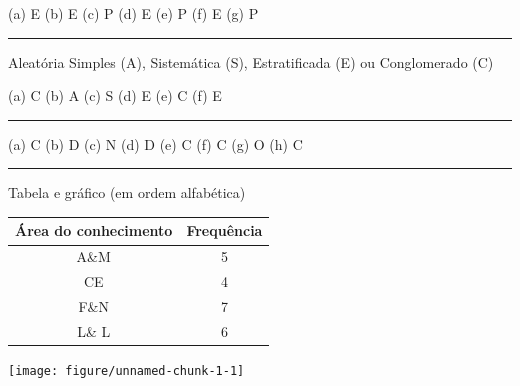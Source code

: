\documentclass[a4paper,11pt,fleqn]{article}\usepackage[]{graphicx}\usepackage[]{color}
\newenvironment{knitrout}{}{} %
\theoremstyle{definition}
\begin{document}
\begin{compactenum}[2.]
\item (a) E \quad (b) E \quad (c) P \quad (d) E \quad (e) P \quad (f)
  E \quad (g) P
\end{compactenum}

\vspace{0.3cm}
\hrule
\vspace{0.3cm}

\begin{compactenum}[3.]
\item Aleatória Simples (A), Sistemática (S), Estratificada (E) ou
  Conglomerado (C)
  \begin{compactenum}
  \item[] (a) C \quad (b) A \quad (c) S \quad (d) E \quad (e) C \quad
    (f) E
  \end{compactenum}
\end{compactenum}

\vspace{0.3cm}
\hrule
\vspace{0.3cm}

\begin{compactenum}[4.]
\item (a) C \quad (b) D \quad (c) N \quad (d) D \quad (e) C \quad (f) C
  \quad (g) O \quad (h) C \quad
\end{compactenum}

\vspace{0.3cm}
\hrule
\vspace{0.3cm}

\begin{compactenum}[5.]
\item Tabela e gráfico (em ordem alfabética)

\begin{multicols}{2}

  \begin{tabular}{cc}
    \hline
    \textbf{Área do conhecimento} & \textbf{Frequência} \\
    \hline
    A\&M & 5 \\
    CE & 4 \\
    F\&N & 7 \\
    L\& L & 6 \\
    \hline
  \end{tabular}

\columnbreak

\begin{knitrout}\small
{}\color{fgcolor}

{\centering \texttt{[image: figure/unnamed-chunk-1-1]} 

}



\end{knitrout}
\end{multicols}

\end{compactenum}
\end{document}
